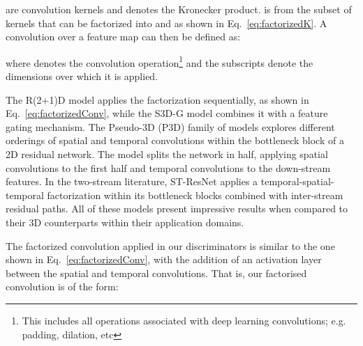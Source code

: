 \documentclass[a4paper,fleqn]{cas-sc}
\begin{document}
are convolution kernels and  denotes the Kronecker product.  is from the subset of kernels that can be factorized into  and  as shown in Eq.~\ref{eq:factorizedK}. A convolution over a feature map  can then be defined as:


where  denotes the convolution operation\footnote{This includes all operations associated with deep learning convolutions; e.g. padding, dilation, etc} and the subscripts denote the dimensions over which it is applied. 

The R(2+1)D model \cite{TranWTRLP18r2plus1d} applies the factorization sequentially, as shown in Eq.~\ref{eq:factorizedConv}, while the S3D-G \cite{XieSHTM18rethinking} model combines it with a feature gating mechanism. The Pseudo-3D (P3D) family of models \cite{QiuYM17pseudo3D} explores different orderings of spatial and temporal convolutions within the bottleneck block of a 2D residual network. The  model \cite{SunJYS15factorized} splits the network in half, applying spatial convolutions to the first half and temporal convolutions to the down-stream features.  In the two-stream literature, ST-ResNet \cite{FeichtenhoferPW16spatiotemporal} applies a temporal-spatial-temporal factorization within its bottleneck blocks combined with inter-stream residual paths. All of these models present impressive results when compared to their 3D counterparts within their application domains.

The factorized convolution applied in our discriminators is similar to the one shown in Eq.~\ref{eq:factorizedConv}, with the addition of an activation layer between the spatial and temporal convolutions. That is, our factorised convolution is of the form:
\end{document}
